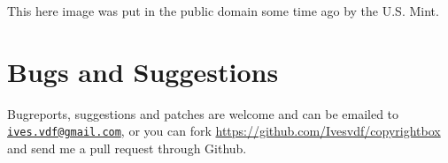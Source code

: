 \documentclass[pagesize=auto]{scrartcl}
\newcommand*{\mail}[1]{\href{mailto:#1}{\texttt{#1}}}
\begin{document}
\makeatother
\begin{center}
      {This here image was put in the public domain some time ago by the U.S. Mint.}
\end{center}

\section{Bugs and Suggestions}
Bugreports, suggestions and patches are welcome and can be emailed to
\mail{ives.vdf@gmail.com}, or you can fork
\url{https://github.com/Ivesvdf/copyrightbox} and send me a pull request
through Github. 
\end{document}
